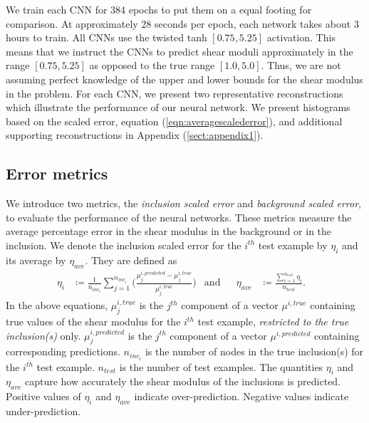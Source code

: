 \documentclass[12pt]{article}
\begin{document}
We train each CNN for 384 epochs to put them on a equal footing for comparison. At approximately ${28}$ seconds per epoch, each network takes about ${3}$ hours to train. All CNNs use the twisted tanh $[0.75,5.25]$ activation. This means that we instruct the CNNs to predict shear moduli approximately in the range $[0.75,5.25]$ as opposed to the true range $[1.0,5.0]$. Thus, we are not assuming perfect knowledge of the upper and lower bounds for the shear modulus in the problem. For each CNN, we present two representative reconstructions which illustrate the performance of our neural network. We present histograms based on the scaled error, equation (\ref{eqn:averagescalederror}), and additional supporting reconstructions in Appendix (\ref{sect:appendix1}).

\subsection{Error metrics}
We introduce two metrics, the \textit{inclusion scaled error} and \textit{background scaled error}, to evaluate the performance of the neural networks. These metrics  measure the average percentage error in the shear modulus in the background or in the inclusion. We denote the inclusion scaled error for the $i^{th}$ test example by $\eta_{i}$ and its average by $\eta_{ave}$. They are defined as 
  \begin{align}
  \eta_{i} &\coloneqq \frac{1}{n_{inc_i}}\sum_{j=1}^{n_{inc_i}}{\Bigg (}\frac{\mu^{i,predicted}_{j}-\mu^{i,true}_{j}}{\mu^{i,true}_{j}}{\Bigg )} &\text{and}  && \eta_{ave} &\coloneqq \frac{\sum_{i=1}^{n_{test}}\eta_{i}}{n_{test}}. &\label{eqn:averageincscalederror}
  \end{align}
In the above equations, $\mu_{j}^{i,true}$ is the $j^{th}$ component of a vector $\mu^{i,true}$ containing true values of the shear modulus for the $i^{th}$ test example, \textit{restricted to the true inclusion(s)} only. $\mu_{j}^{i,predicted}$ is the $j^{th}$ component of a vector $\mu^{i,predicted}$ containing corresponding predictions. $n_{inc_i}$ is the number of nodes in the true inclusion(s) for the $i^{th}$ test example. $n_{test}$ is the number of test examples. The quantities $\eta_i$ and $\eta_{ave}$ capture how accurately the shear modulus of the inclusions is predicted. Positive values of $\eta_i$ and $\eta_{ave}$ indicate over-prediction. Negative values indicate under-prediction.
\end{document}
